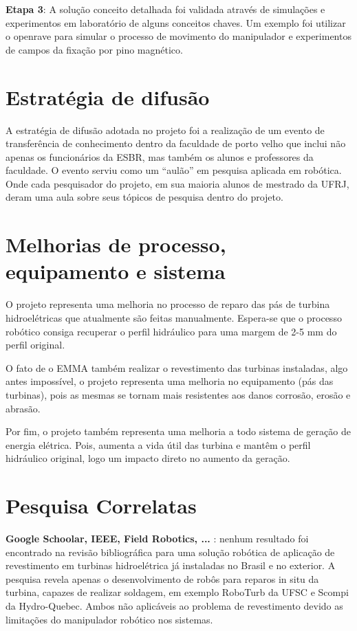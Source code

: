 \textbf{Etapa 3}:  A solução conceito detalhada foi validada através de
simulações e experimentos em laboratório de alguns conceitos chaves. Um exemplo
foi utilizar o openrave para simular o processo de movimento do manipulador e
experimentos de campos da fixação por pino magnético.

\section{Estratégia de difusão}

A estratégia de difusão adotada no projeto foi a realização de um evento de
transferência de conhecimento dentro da faculdade de porto velho que inclui não
apenas os funcionários da ESBR, mas também os alunos e professores da faculdade.
O evento serviu como um “aulão” em pesquisa aplicada em robótica. Onde cada
pesquisador do projeto, em sua maioria alunos de mestrado da UFRJ, deram uma
aula sobre seus tópicos de pesquisa dentro do projeto.


\section{Melhorias de processo, equipamento e sistema}

O projeto representa uma melhoria no processo de reparo das pás de turbina
hidroelétricas que atualmente são feitas manualmente. Espera-se que o processo
robótico consiga recuperar o perfil hidráulico para uma margem de 2-5 mm do perfil original.

O fato de o EMMA também realizar o revestimento das turbinas instaladas, algo
antes impossível, o projeto representa uma melhoria no equipamento (pás das
turbinas), pois as mesmas se tornam mais resistentes aos danos corrosão, erosão e abrasão.

Por fim, o projeto também representa uma melhoria a todo sistema de geração de
energia elétrica. Pois, aumenta a vida útil das turbina e mantêm o perfil
hidráulico original, logo um impacto direto no aumento da geração.

\section{Pesquisa Correlatas}

\textbf{Google Schoolar, IEEE, Field Robotics, ... }: nenhum resultado foi
encontrado na revisão bibliográfica para uma solução robótica de aplicação de
revestimento em turbinas hidroelétrica já instaladas no Brasil e no exterior. A
pesquisa revela apenas o desenvolvimento de robôs para reparos in situ da
turbina, capazes de realizar soldagem, em exemplo RoboTurb da UFSC e Scompi da
Hydro-Quebec. Ambos não aplicáveis ao problema de revestimento devido as
limitações do manipulador robótico nos sistemas.

